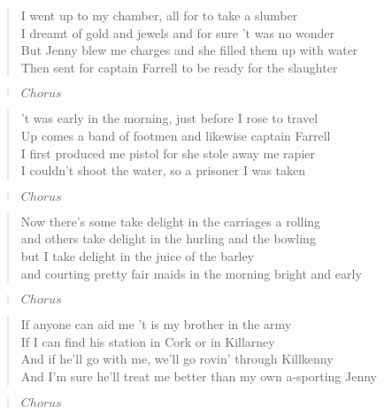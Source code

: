 \documentclass[9pt,a4paper,oneside, onecolumn]{article}
\begin{document}
\begin{verse}
I went up to my chamber, all for to take a slumber\\
I dreamt of gold and jewels and for sure 't was no wonder\\
But Jenny blew me charges and she filled them up with water\\
Then sent for captain Farrell to be ready for the slaughter\\
\end{verse}

\begin{verse}
$Chorus$
\end{verse}

\begin{verse}
't was early in the morning, just before I rose to travel\\
Up comes a band of footmen and likewise captain Farrell\\
I first produced me pistol for she stole away me rapier\\
I couldn't shoot the water, so a prisoner I was taken\\
\end{verse}

\begin{verse}
$Chorus$
\end{verse}

\begin{verse}
Now there's some take delight in the carriages a rolling\\
and others take delight in the hurling and the bowling\\
but I take delight in the juice of the barley\\
and courting pretty fair maids in the morning bright and early\\
\end{verse}

\begin{verse}
$Chorus$
\end{verse}

\begin{verse}
If anyone can aid me 't is my brother in the army\\
If I can find his station in Cork or in Killarney\\
And if he'll go with me, we'll go rovin' through Killkenny\\
And I'm sure he'll treat me better than my own a-sporting Jenny\\
\end{verse}

\begin{verse}
$Chorus$
\end{verse}
\end{document}
